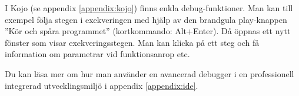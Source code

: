 \noindent I Kojo (se appendix \ref{appendix:kojo}) finns enkla debug-funktioner. Man kan till exempel följa stegen i exekveringen med hjälp av den brandgula play-knappen ''Kör och spåra programmet'' (kortkommando: Alt+Enter). Då öppnas ett nytt fönster som visar exekveringsstegen. Man kan klicka på ett steg och få  information om parametrar vid funktionsanrop etc.

Du kan läsa mer om hur man använder en avancerad debugger i en professionell integrerad utvecklingsmiljö i appendix \ref{appendix:ide}.

